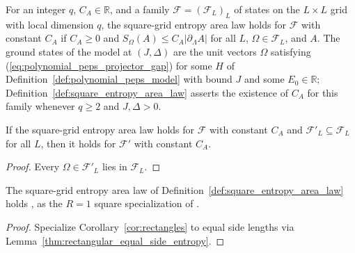 \begin{definition}
    \label{def:square_entropy_area_law_at}
    \leanok
    For an integer $q$, $C_A\in\mathbb R$, and a family $\mathcal F=(\mathcal F_L)_L$
    of states on the $L\times L$ grid with local dimension $q$, the square-grid
    entropy area law holds for $\mathcal F$ with constant $C_A$ if $C_A\ge0$ and
    $S_\Omega(A)\le C_A|\partial_\Lambda A|$ for all $L$, $\Omega\in\mathcal F_L$,
    and $A$. The ground states of the model at $(J,\Delta)$ are the unit vectors
    $\Omega$ satisfying (\ref{eq:polynomial_peps_projector_gap}) for some $H$ of
    Definition~\ref{def:polynomial_peps_model} with bound $J$ and some
    $E_0\in\mathbb R$; Definition~\ref{def:square_entropy_area_law} asserts the
    existence of $C_A$ for this family whenever $q\ge2$ and $J,\Delta>0$.
\end{definition}

\begin{lemma}
    \label{thm:square_entropy_area_law_at_mono}
    \leanok
    If the square-grid entropy area law holds for $\mathcal F$ with constant
    $C_A$ and $\mathcal F'_L\subseteq\mathcal F_L$ for all $L$, then it holds
    for $\mathcal F'$ with constant $C_A$.
\end{lemma}
\begin{proof}
    \leanok
    Every $\Omega\in\mathcal F'_L$ lies in $\mathcal F_L$.
\end{proof}

\begin{theorem}
    \label{thm:openai_square_area_law}
    \leanok
    The square-grid entropy area law of Definition~\ref{def:square_entropy_area_law}
    holds \cite[Proposition~2.1]{OpenAI2026PolynomialPEPS}, as the $R=1$ square
    specialization of \cite[Theorem~1.1 and Corollary~1.2]{OpenAI2026AreaLaw}.
\end{theorem}
\begin{proof}
    \leanok
    Specialize Corollary~\ref{cor:rectangles} to equal side lengths via
    Lemma~\ref{thm:rectangular_equal_side_entropy}.
\end{proof}

